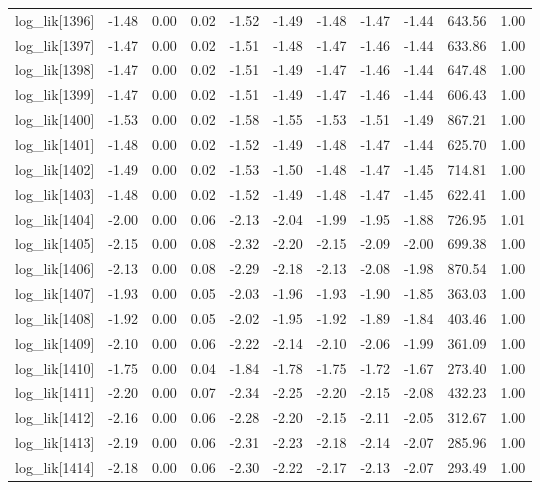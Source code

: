 \begin{table}[ht]
\begin{tabular}{rrrrrrrrrrr}
  log\_lik[1396] & -1.48 & 0.00 & 0.02 & -1.52 & -1.49 & -1.48 & -1.47 & -1.44 & 643.56 & 1.00 \\ 
  log\_lik[1397] & -1.47 & 0.00 & 0.02 & -1.51 & -1.48 & -1.47 & -1.46 & -1.44 & 633.86 & 1.00 \\ 
  log\_lik[1398] & -1.47 & 0.00 & 0.02 & -1.51 & -1.49 & -1.47 & -1.46 & -1.44 & 647.48 & 1.00 \\ 
  log\_lik[1399] & -1.47 & 0.00 & 0.02 & -1.51 & -1.49 & -1.47 & -1.46 & -1.44 & 606.43 & 1.00 \\ 
  log\_lik[1400] & -1.53 & 0.00 & 0.02 & -1.58 & -1.55 & -1.53 & -1.51 & -1.49 & 867.21 & 1.00 \\ 
  log\_lik[1401] & -1.48 & 0.00 & 0.02 & -1.52 & -1.49 & -1.48 & -1.47 & -1.44 & 625.70 & 1.00 \\ 
  log\_lik[1402] & -1.49 & 0.00 & 0.02 & -1.53 & -1.50 & -1.48 & -1.47 & -1.45 & 714.81 & 1.00 \\ 
  log\_lik[1403] & -1.48 & 0.00 & 0.02 & -1.52 & -1.49 & -1.48 & -1.47 & -1.45 & 622.41 & 1.00 \\ 
  log\_lik[1404] & -2.00 & 0.00 & 0.06 & -2.13 & -2.04 & -1.99 & -1.95 & -1.88 & 726.95 & 1.01 \\ 
  log\_lik[1405] & -2.15 & 0.00 & 0.08 & -2.32 & -2.20 & -2.15 & -2.09 & -2.00 & 699.38 & 1.00 \\ 
  log\_lik[1406] & -2.13 & 0.00 & 0.08 & -2.29 & -2.18 & -2.13 & -2.08 & -1.98 & 870.54 & 1.00 \\ 
  log\_lik[1407] & -1.93 & 0.00 & 0.05 & -2.03 & -1.96 & -1.93 & -1.90 & -1.85 & 363.03 & 1.00 \\ 
  log\_lik[1408] & -1.92 & 0.00 & 0.05 & -2.02 & -1.95 & -1.92 & -1.89 & -1.84 & 403.46 & 1.00 \\ 
  log\_lik[1409] & -2.10 & 0.00 & 0.06 & -2.22 & -2.14 & -2.10 & -2.06 & -1.99 & 361.09 & 1.00 \\ 
  log\_lik[1410] & -1.75 & 0.00 & 0.04 & -1.84 & -1.78 & -1.75 & -1.72 & -1.67 & 273.40 & 1.00 \\ 
  log\_lik[1411] & -2.20 & 0.00 & 0.07 & -2.34 & -2.25 & -2.20 & -2.15 & -2.08 & 432.23 & 1.00 \\ 
  log\_lik[1412] & -2.16 & 0.00 & 0.06 & -2.28 & -2.20 & -2.15 & -2.11 & -2.05 & 312.67 & 1.00 \\ 
  log\_lik[1413] & -2.19 & 0.00 & 0.06 & -2.31 & -2.23 & -2.18 & -2.14 & -2.07 & 285.96 & 1.00 \\ 
  log\_lik[1414] & -2.18 & 0.00 & 0.06 & -2.30 & -2.22 & -2.17 & -2.13 & -2.07 & 293.49 & 1.00 \\ 

\end{tabular}
\end{table}
